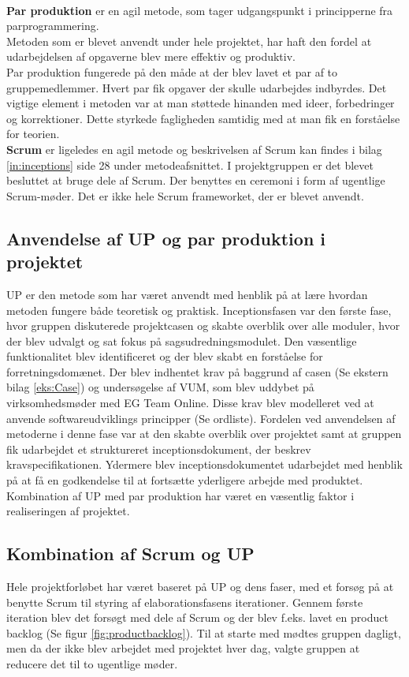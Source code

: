 \pagebreak \\
\textbf{Par produktion} er en agil metode, som tager udgangspunkt i principperne fra parprogrammering. \\
Metoden som er blevet anvendt under hele projektet, har haft den fordel at udarbejdelsen af opgaverne blev mere effektiv og produktiv. \\
Par produktion fungerede på den måde at der blev lavet et par af to gruppemedlemmer. Hvert par fik opgaver der skulle udarbejdes indbyrdes. Det vigtige element i metoden var at man støttede hinanden med ideer, forbedringer og korrektioner. Dette styrkede fagligheden samtidig med at man fik en forståelse for teorien. \\
\textbf{Scrum} er ligeledes en agil metode og beskrivelsen af Scrum kan findes i bilag \ref{in:inceptions} side 28 under metodeafsnittet. I projektgruppen er det blevet besluttet at bruge dele af Scrum. Der benyttes en ceremoni i form af ugentlige Scrum-møder. Det er ikke hele Scrum frameworket, der er blevet anvendt.
\subsection{Anvendelse af UP og par produktion i projektet}
UP er den metode som har været anvendt med henblik på at lære hvordan metoden fungere både teoretisk og praktisk. Inceptionsfasen var den første fase, hvor gruppen diskuterede projektcasen og skabte overblik over alle moduler, hvor der blev udvalgt og sat fokus på sagsudredningsmodulet. Den væsentlige funktionalitet blev identificeret og der blev skabt en forståelse for forretningsdomænet. Der blev indhentet krav på baggrund af casen  (Se ekstern bilag \ref{eks:Case}) og undersøgelse af VUM, som blev uddybet på virksomhedsmøder med EG Team Online. 
Disse krav blev modelleret ved at anvende softwareudviklings principper (Se ordliste). 
Fordelen ved anvendelsen af metoderne i denne fase var at den skabte overblik over projektet samt at gruppen fik udarbejdet et struktureret inceptionsdokument, der beskrev kravspecifikationen. 
Ydermere blev inceptionsdokumentet udarbejdet med henblik på at få en godkendelse til at fortsætte yderligere arbejde med produktet. Kombination af UP med par produktion har været en væsentlig faktor i realiseringen af projektet.
\subsection{Kombination af Scrum og UP} \label{sec:scrum og up}
Hele projektforløbet har været baseret på UP og dens faser, med et forsøg på at benytte Scrum til styring af elaborationsfasens iterationer. Gennem første iteration blev det forsøgt med dele af Scrum og der blev f.eks. lavet en product backlog 
(Se figur \ref{fig:productbacklog}). Til at starte med mødtes gruppen dagligt, men da der ikke blev arbejdet med projektet hver dag, valgte gruppen at reducere det til to ugentlige møder. \newpage
